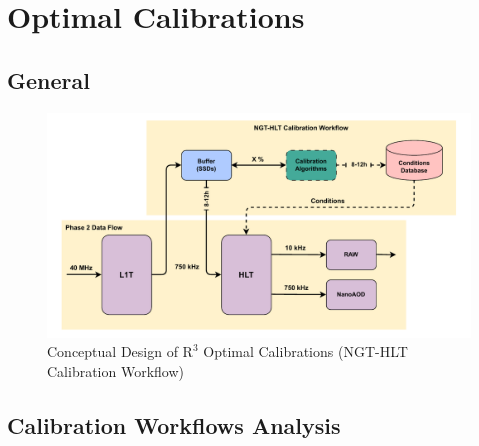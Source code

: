 \chapter{Optimal Calibrations}
\section{General} %



\begin{figure}[h!]	
\centering
\includegraphics[width=\textwidth]{figures/NGT-HLT_Calibration_Workflow.pdf} %
\caption{Conceptual Design of $\mathrm{R}^{3}$ Optimal Calibrations (NGT-HLT Calibration Workflow)}
\label{fig:NGT-HLT_CalibrationWorkflow}
\end{figure}

\section{Calibration Workflows Analysis}

